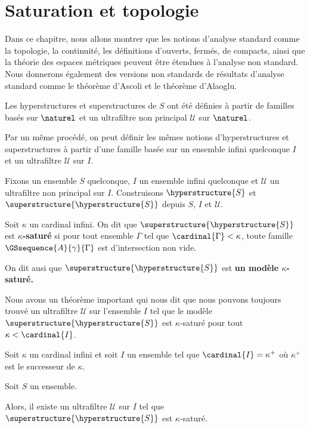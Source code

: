 \chapter{Saturation et topologie}

Dans ce chapitre, nous allons montrer que les notions d'analyse standard comme
la topologie, la continuité, les définitions d'ouverts, fermés, de compacts,
ainsi que la théorie des espaces métriques peuvent être étendues à l'analyse non
standard. Nous donnerons également des versions non standards de résultats
d'analyse standard comme le théorème d'Ascoli et le théorème d'Alaoglu.

Les hyperstructures et superstructures de $S$ ont été définies à partir de
familles basés sur $\naturel$ et un ultrafiltre non principal $\mathcal{U}$ sur
$\naturel$.

Par un même procédé, on peut définir les mêmes notions d'hyperstructures et
superstructures à partir d'une famille basée sur un ensemble infini quelconque
$I$ et un ultrafiltre $\mathcal{U}$ sur $I$.

Fixons un ensemble $S$ quelconque, $I$ un ensemble infini quelconque et
$\mathcal{U}$ un ultrafiltre non principal sur $I$. Construisons
$\hyperstructure{S}$ et $\superstructure{\hyperstructure{S}}$ depuis $S$, $I$ et
$\mathcal{U}$.

\begin{definition} 
	Soit $\kappa$ un cardinal infini.
	On dit que $\superstructure{\hyperstructure{S}}$ est \textbf{$\kappa$-saturé} si pour tout
	ensemble $\Gamma$ tel que $\cardinal{\Gamma} < \kappa$, toute famille
	$\GSsequence{A}{\gamma}{\Gamma}$ est d'intersection non vide.

	On dit ausi que $\superstructure{\hyperstructure{S}}$ est \textbf{un modèle
	$\kappa$-saturé.}
\end{definition}

Nous avons un théorème important qui nous dit que nous pouvons toujours trouvé
un ultrafiltre $\mathcal{U}$ sur l'ensemble $I$ tel que le modèle
$\superstructure{\hyperstructure{S}}$ est $\kappa$-saturé pour tout $\kappa <
\cardinal{I}$.

\begin{theorem}
	Soit $\kappa$ un cardinal infini et soit $I$ un ensemble tel que
	$\cardinal{I} = \kappa^{+}$ où $\kappa^{+}$ est le successeur de $\kappa$.

	Soit $S$ un ensemble.

	Alors, il existe un ultrafiltre $\mathcal{U}$ sur $I$ tel que
	$\superstructure{\hyperstructure{S}}$ est $\kappa$-saturé.
\end{theorem}

